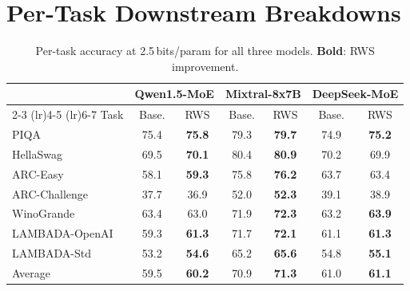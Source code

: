 \section{Per-Task Downstream Breakdowns}
\label{app:per-task}

\begin{table}[h]
\centering
\small
\setlength{\tabcolsep}{3pt}
\caption{Per-task accuracy at 2.5\,bits/param for all three models. \textbf{Bold}: RWS improvement.}
\begin{tabular}{l cc cc cc}
\toprule
& \multicolumn{2}{c}{Qwen1.5-MoE} & \multicolumn{2}{c}{Mixtral-8x7B} & \multicolumn{2}{c}{DeepSeek-MoE} \\
\cmidrule(lr){2-3} \cmidrule(lr){4-5} \cmidrule(lr){6-7}
Task & Base. & RWS & Base. & RWS & Base. & RWS \\
\midrule
PIQA            & 75.4 & \textbf{75.8} & 79.3 & \textbf{79.7} & 74.9 & \textbf{75.2} \\
HellaSwag       & 69.5 & \textbf{70.1} & 80.4 & \textbf{80.9} & 70.2 & 69.9 \\
ARC-Easy        & 58.1 & \textbf{59.3} & 75.8 & \textbf{76.2} & 63.7 & 63.4 \\
ARC-Challenge   & 37.7 & 36.9          & 52.0 & \textbf{52.3} & 39.1 & 38.9 \\
WinoGrande      & 63.4 & 63.0          & 71.9 & \textbf{72.3} & 63.2 & \textbf{63.9} \\
LAMBADA-OpenAI  & 59.3 & \textbf{61.3} & 71.7 & \textbf{72.1} & 61.1 & \textbf{61.3} \\
LAMBADA-Std     & 53.2 & \textbf{54.6} & 65.2 & \textbf{65.6} & 54.8 & \textbf{55.1} \\
\midrule
Average         & 59.5 & \textbf{60.2} & 70.9 & \textbf{71.3} & 61.0 & \textbf{61.1} \\
\bottomrule
\end{tabular}
\end{table}

